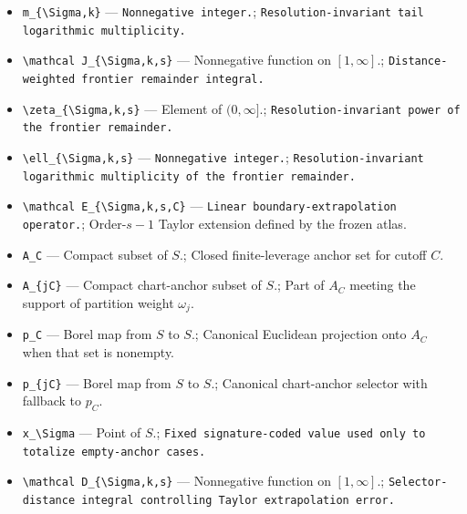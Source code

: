 \documentclass{article}
\begin{document}
\begin{itemize}
  \item \texttt{m\_\allowbreak{}\{\textbackslash{}\allowbreak{}Sigma,\allowbreak{}k\}\allowbreak{}} --- \texttt{Nonnegative integer.}; \texttt{Resolution-\allowbreak{}invariant tail logarithmic multiplicity.}
  \item \texttt{\textbackslash{}\allowbreak{}mathcal J\_\allowbreak{}\{\textbackslash{}\allowbreak{}Sigma,\allowbreak{}k,\allowbreak{}s\}\allowbreak{}} --- Nonnegative function on \([1,\infty]\).; \texttt{Distance-\allowbreak{}weighted frontier remainder integral.}
  \item \texttt{\textbackslash{}\allowbreak{}zeta\_\allowbreak{}\{\textbackslash{}\allowbreak{}Sigma,\allowbreak{}k,\allowbreak{}s\}\allowbreak{}} --- Element of \( (0,\infty]\).; \texttt{Resolution-\allowbreak{}invariant power of the frontier remainder.}
  \item \texttt{\textbackslash{}\allowbreak{}ell\_\allowbreak{}\{\textbackslash{}\allowbreak{}Sigma,\allowbreak{}k,\allowbreak{}s\}\allowbreak{}} --- \texttt{Nonnegative integer.}; \texttt{Resolution-\allowbreak{}invariant logarithmic multiplicity of the frontier remainder.}
  \item \texttt{\textbackslash{}\allowbreak{}mathcal E\_\allowbreak{}\{\textbackslash{}\allowbreak{}Sigma,\allowbreak{}k,\allowbreak{}s,\allowbreak{}C\}\allowbreak{}} --- \texttt{Linear boundary-\allowbreak{}extrapolation operator.}; Order-\(s-1\) Taylor extension defined by the frozen atlas.
  \item \texttt{A\_\allowbreak{}C} --- Compact subset of \(S\).; Closed finite-leverage anchor set for cutoff \(C\).
  \item \texttt{A\_\allowbreak{}\{jC\}\allowbreak{}} --- Compact chart-anchor subset of \(S\).; Part of \(A_C\) meeting the support of partition weight \(\omega_j\).
  \item \texttt{p\_\allowbreak{}C} --- Borel map from \(S\) to \(S\).; Canonical Euclidean projection onto \(A_C\) when that set is nonempty.
  \item \texttt{p\_\allowbreak{}\{jC\}\allowbreak{}} --- Borel map from \(S\) to \(S\).; Canonical chart-anchor selector with fallback to \(p_C\).
  \item \texttt{x\_\allowbreak{}\textbackslash{}\allowbreak{}Sigma} --- Point of \(S\).; \texttt{Fixed signature-\allowbreak{}coded value used only to totalize empty-\allowbreak{}anchor cases.}
  \item \texttt{\textbackslash{}\allowbreak{}mathcal D\_\allowbreak{}\{\textbackslash{}\allowbreak{}Sigma,\allowbreak{}k,\allowbreak{}s\}\allowbreak{}} --- Nonnegative function on \([1,\infty]\).; \texttt{Selector-\allowbreak{}distance integral controlling Taylor extrapolation error.}

\end{itemize}
\end{document}
